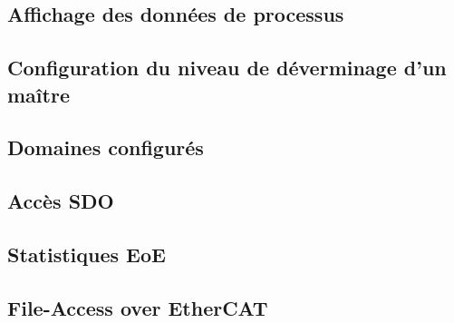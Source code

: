 \documentclass[a4paper,12pt,BCOR6mm,bibtotoc,idxtotoc]{scrbook}
\begin{document}
\subsection{Affichage des donn\'ees de processus}




\subsection{Configuration du niveau de d\'everminage d'un ma\^itre}
\label{sec:ethercat-debug}




\subsection{Domaines configur\'es}




\subsection{Acc\`es SDO}






\subsection{Statistiques EoE}




\subsection{File-Access over EtherCAT}
\end{document}
